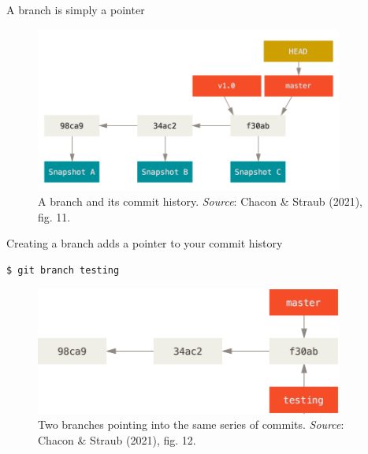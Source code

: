 \documentclass[handout]{beamer}
\begin{document}
\begin{frame}{A branch is simply a pointer}
\begin{figure}
	\includegraphics[width=0.9\textwidth]{figures/fig11_branch_history.png}
	\caption{A branch and its commit history. \textit{Source}: Chacon \& Straub (2021), fig. 11.}
\end{figure}
\end{frame}	

\begin{frame}[fragile]{Creating a branch adds a pointer to your commit history}
\begin{lstlisting}
$ git branch testing
\end{lstlisting}
\begin{figure}
	\includegraphics[width=0.9\textwidth]{figures/fig12_new_branch.png}
	\caption{Two branches pointing into the same series of commits. \textit{Source}: Chacon \& Straub (2021), fig. 12.}
\end{figure}
\end{frame}
\end{document}
